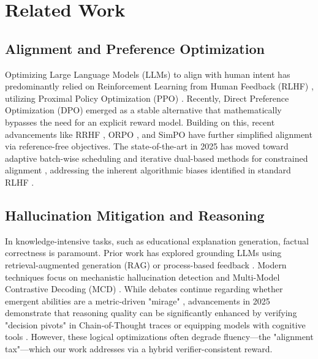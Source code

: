 \section{Related Work}

\subsection{Alignment and Preference Optimization}
Optimizing Large Language Models (LLMs) to align with human intent has predominantly relied on Reinforcement Learning from Human Feedback (RLHF) \cite{ouyang2022training}, utilizing Proximal Policy Optimization (PPO) \cite{schulman2017proximal}. Recently, Direct Preference Optimization (DPO) \cite{rafailov2023direct} emerged as a stable alternative that mathematically bypasses the need for an explicit reward model. Building on this, recent advancements like RRHF \cite{yuan2023rrhf}, ORPO \cite{hong2024orpo}, and SimPO \cite{meng2024simpo} have further simplified alignment via reference-free objectives. The state-of-the-art in 2025 has moved toward adaptive batch-wise scheduling \cite{zhang2025adaptive} and iterative dual-based methods for constrained alignment \cite{chen2025constrained}, addressing the inherent algorithmic biases identified in standard RLHF \cite{ji2024limits, shrivastava2024algorithmic}.

\subsection{Hallucination Mitigation and Reasoning}
In knowledge-intensive tasks, such as educational explanation generation, factual correctness is paramount. Prior work has explored grounding LLMs using retrieval-augmented generation (RAG) \cite{lewis2020retrieval} or process-based feedback \cite{uesato2023verify}. Modern techniques focus on mechanistic hallucination detection \cite{li2023haludetect} and Multi-Model Contrastive Decoding (MCD) \cite{liu2025contrastive}. While debates continue regarding whether emergent abilities are a metric-driven "mirage" \cite{schaeffer2023mirage}, advancements in 2025 demonstrate that reasoning quality can be significantly enhanced by verifying "decision pivots" in Chain-of-Thought traces \cite{wang2025pivots} or equipping models with cognitive tools \cite{zhao2025cognitive}. However, these logical optimizations often degrade fluency—the "alignment tax"—which our work addresses via a hybrid verifier-consistent reward.

